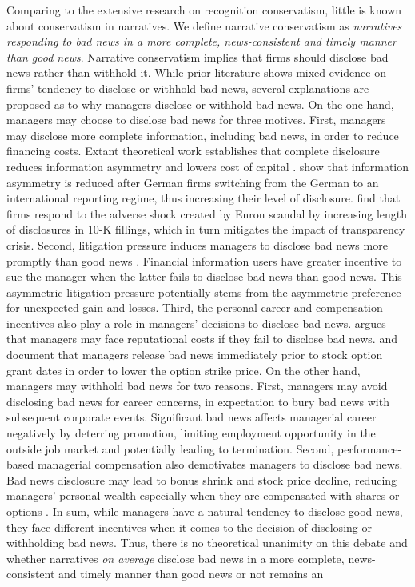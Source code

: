 \documentclass[a4paper]{article}
\begin{document}
\begin{spacing}{2}
Comparing to the extensive research on recognition conservatism, little is known about conservatism in narratives. We define narrative conservatism as \textit{narratives responding to bad news in a more complete, news-consistent and timely manner than good news}. Narrative conservatism implies that firms should disclose bad news rather than withhold it. While prior literature shows mixed evidence on firms' tendency to disclose or withhold bad news, several explanations are proposed as to why managers disclose or withhold bad news. On the one hand, managers may choose to disclose bad news for three motives. First, managers may disclose more complete information, including bad news, in order to reduce financing costs. Extant theoretical work establishes that complete disclosure reduces information asymmetry and lowers cost of capital \citep[e.g.,][]{diamondDisclosureLiquidityCost1991, baimanRelationCapitalMarkets1996}. \citet*{leuzEconomicConsequencesIncreased2000} show that information asymmetry is reduced after German firms switching from the German to an international reporting regime, thus increasing their level of disclosure. \cite{leuzDisclosureCostCapital2009} find that firms respond to the adverse shock created by Enron scandal by increasing length of disclosures in 10-K fillings, which in turn mitigates the impact of transparency crisis. Second, litigation pressure induces managers to disclose bad news more promptly than good news \citep*{skinnerWhyFirmsVoluntarily1994, skinnerEarningsDisclosuresStockholder1997, kasznikWarnNotWarn1995}. Financial information users have greater incentive to sue the manager when the latter fails to disclose bad news than good news. This asymmetric litigation pressure potentially stems from the asymmetric preference for unexpected gain and losses. Third, the personal career and compensation incentives also play a role in managers' decisions to disclose bad news. \citet{skinnerWhyFirmsVoluntarily1994} argues that managers may face reputational costs if they fail to disclose bad news. \citet*{yermackGoodTimingCEO1997} and \citet*{aboodyCEOStockOption2000} document that managers release bad news immediately prior to stock option grant dates in order to lower the option strike price. On the other hand, managers may withhold bad news for two reasons. First, managers may avoid disclosing bad news for career concerns, in expectation to bury bad news with subsequent corporate events. Significant bad news affects managerial career negatively by deterring promotion, limiting employment opportunity in the outside job market and potentially leading to termination. Second, performance-based managerial compensation also demotivates managers to disclose bad news. Bad news disclosure may lead to bonus shrink and stock price decline, reducing managers' personal wealth especially when they are compensated with shares or options \citep{kothariManagersWithholdBad2009}. In sum, while managers have a natural tendency to disclose good news, they face different incentives when it comes to the decision of disclosing or withholding bad news. Thus, there is no theoretical unanimity on this debate and whether narratives \textit{on average} disclose bad news in a more complete, news-consistent and timely manner than good news or not remains an 
\end{spacing}
\end{document}
